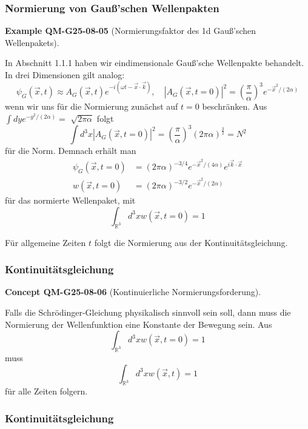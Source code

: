 \documentclass[10pt, letterpaper]{article}
\newcommand{\CustomHeading}[3]{%
  \par\medskip\noindent%
  \textbf{#1 #2} \textnormal{(#3)}.\enskip%
}
\newenvironment{EXA}[2]{\begin{unitbox}\CustomHeading{Example}{#1}{#2}}{\end{unitbox}}
\newenvironment{CONC}[2]{\begin{unitbox}\CustomHeading{Concept}{#1}{#2}}{\end{unitbox}}
\begin{document}
\subsubsection*{Normierung von Gauß'schen Wellenpakten}


\begin{EXA}{QM-G25-08-05}{Normierungsfaktor des 1d Gauß'schen Wellenpakets}
In Abschnitt 1.1.1 haben wir eindimensionale Gauß'sche Wellenpakte behandelt. In drei Dimensionen gilt analog:
$$
\psi_{G}(\vec{x}, t) \approx A_{G}(\vec{x}, t) e^{-i(\omega t-\vec{x} \cdot \vec{k})}, \quad\left|A_{G}(\vec{x}, t=0)\right|^{2}=\left(\frac{\pi}{\alpha}\right)^{3} e^{-\vec{x}^{2} /(2 \alpha)}
$$
wenn wir uns für die Normierung zunächst auf $t=0$ beschränken. Aus $\int d y e^{-y^{2} /(2 \alpha)}=$ $\sqrt{2 \pi \alpha}$ folgt
$$
\int d^{3} x\left|A_{G}(\vec{x}, t=0)\right|^{2}=\left(\frac{\pi}{\alpha}\right)^{3}(2 \pi \alpha)^{\frac{3}{2}}=N^{2}
$$
für die Norm. Demnach erhält man
$$
\begin{aligned}
\psi_{G}(\vec{x}, t=0) & =(2 \pi \alpha)^{-3 / 4} e^{-\vec{x}^{2} /(4 \alpha)} e^{i \vec{k} \cdot \vec{x}} \\
w(\vec{x}, t=0) & =(2 \pi \alpha)^{-3 / 2} e^{-\vec{x}^{2} /(2 \alpha)}
\end{aligned}
$$
für das normierte Wellenpaket, mit
$$
\int_{\mathbb{R}^{3}} d^{3} x w(\vec{x}, t=0)=1
$$
\end{EXA}

Für allgemeine Zeiten $t$ folgt die Normierung aus der Kontinuitätsgleichung.






\subsubsection{Kontinuitätsgleichung}




\begin{CONC}{QM-G25-08-06}{Kontinuierliche Normierungsforderung}
Falls die Schrödinger-Gleichung physikalisch sinnvoll sein soll, dann muss die Normierung der Wellenfunktion eine Konstante der Bewegung sein. Aus
$$
\int_{\mathbb{R}^{3}} d^{3} x w(\vec{x}, t=0)=1
$$
muss
$$
\int_{\mathbb{R}^{3}} d^{3} x w(\vec{x}, t)=1
$$
für alle Zeiten folgern.
\end{CONC}


\subsubsection*{Kontinuitätsgleichung}
\end{document}
